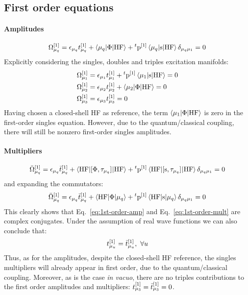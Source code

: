 \subsection{First order equations}\label{sec:first-order-pt}

\paragraph*{Amplitudes}
\begin{equation}\label{eq:1st-order-amp}
  \Omega_{\mu_q}^{[1]} = \epsilon_{\mu_q}t_{\mu_q}^{[1]}
  + \braket{\mu_q | \Phi | \mathrm{HF}}
  + {}^t\mathrm{p}^{[1]}\braket{\mu_q | \mathrm{s} | \mathrm{HF}}\delta_{\mu_q\mu_1}
  = 0
\end{equation}
Explicitly considering the singles, doubles and triples excitation manifolds:
\begin{subequations}
  \begin{align}
  \Omega_{\mu_1}^{[1]} &= \epsilon_{\mu_1}t_{\mu_1}^{[1]}
  + {}^t\mathrm{p}^{[1]}\braket{\mu_1 | \mathrm{s} | \mathrm{HF}}
  = 0 \\
  \Omega_{\mu_2}^{[1]} &= \epsilon_{\mu_2}t_{\mu_2}^{[1]}
  + \braket{\mu_2 | \Phi | \mathrm{HF}}
  = 0 \\
  \Omega_{\mu_3}^{[1]} &= \epsilon_{\mu_3}t_{\mu_3}^{[1]} = 0
  \end{align}
\end{subequations}
Having chosen a closed-shell \acrshort{HF} as reference,
the term $\braket{\mu_1 | \Phi | \mathrm{HF}}$ is zero in the
first-order singles equation. However, due to the quantum/classical
coupling, there will still be nonzero first-order singles amplitudes.

\paragraph*{Multipliers}
\begin{equation}%
  \bar{\Omega}_{\mu_q}^{[1]} =
    \denom{\mu_q}\tbar{\mu_q}^{[1]}
    + \braket{\mathrm{HF} | \commutator{\Phi}{\cluster{\mu_q}} | \mathrm{HF}}
    + {}^t\p^{[1]}\braket{\mathrm{HF} |
    \commutator{\s}{\cluster{\mu_q}} | \mathrm{HF}}\delta_{\mu_q\mu_1} =0
\end{equation}
and expanding the commutators:
\begin{equation}\label{eq:1st-order-mult}
  \bar{\Omega}_{\mu_q}^{[1]} =
    \epsilon_{\mu_q}\bar{t}_{\mu_q}^{[1]}
    + \braket{\mathrm{HF} | \Phi | \mu_q}
    + {}^t\mathrm{p}^{[1]}\braket{\mathrm{HF} | \mathrm{s} | \mu_q}\delta_{\mu_q\mu_1} =0
\end{equation}
This clearly shows that Eq.~\eqref{eq:1st-order-amp}
and Eq.~\eqref{eq:1st-order-mult} are complex conjugates. Under the
assumption of real wave functions we can also conclude that:
\begin{equation}
  t_{\mu_u}^{[1]} = \bar{t}_{\mu_u}^{[1]},\,\,\forall u
\end{equation}
Thus, as for the amplitudes, despite the closed-shell \acrshort{HF} reference, the singles
multipliers will already appear in first order, due to the
quantum/classical coupling.
Moreover, as is the case \emph{in vacuo}, there are no triples contributions to
the first order amplitudes and multipliers: $t_{\mu_3}^{[1]} = \bar{t}_{\mu_3}^{[1]} = 0$.

